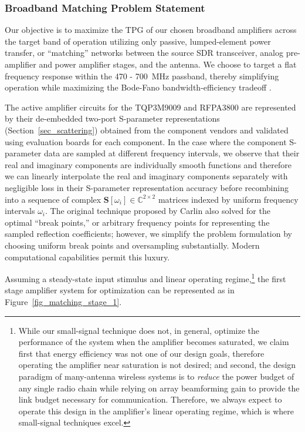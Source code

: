 \subsubsection{Broadband Matching Problem Statement}
\label{sec_srft_problem_statement}
	
	Our objective is to maximize the \ac{TPG} of our chosen broadband amplifiers across the target band of operation utilizing only passive, lumped-element power transfer, or ``matching'' networks between the source \ac{SDR} transceiver, analog pre-amplifier and power amplifier stages, and the antenna.
	We choose to target a flat frequency response within the 470 - 700~MHz passband, thereby simplifying operation while maximizing the Bode-Fano bandwidth-efficiency tradeoff  \cite{bode1945network, fano1950theoretical}.
	
	The active amplifier circuits for the TQP3M9009 and RFPA3800 are represented by their de-embedded two-port S-parameter representations (Section~\ref{sec_scattering}) obtained from the component vendors and validated using evaluation boards for each component.
	In the case where the component S-parameter data are sampled at different frequency intervals, we observe that their real and imaginary components are individually smooth functions and therefore we can linearly interpolate the real and imaginary components separately with negligible loss in their S-parameter representation accuracy before recombining into a sequence of complex $\mathbf{S}[\omega_i]\in\mathbb{C}^{2\times 2}$ matrices indexed by uniform frequency intervals $\omega_i$.
	The original technique proposed by Carlin \cite{carlin1977new} also solved for the optimal ``break points,'' or arbitrary frequency points for representing the sampled reflection coefficients; however, we simplify the problem formulation by choosing uniform break points and oversampling substantially.
	Modern computational capabilities permit this luxury.
	
	Assuming a steady-state input stimulus and linear operating regime,\footnote{While our small-signal technique does not, in general, optimize the performance of the system when the amplifier becomes saturated, we claim first that energy efficiency was not one of our design goals, therefore operating the amplifier near saturation is not desired; and second, the design paradigm of many-antenna wireless systems is to \emph{reduce} the power budget of any single radio chain while relying on array beamforming gain to provide the link budget necessary for communication. Therefore, we always expect to operate this design in the amplifier's linear operating regime, which is where small-signal techniques excel.} the first stage amplifier system for optimization can be represented as in Figure~\ref{fig_matching_stage_1}.
	
